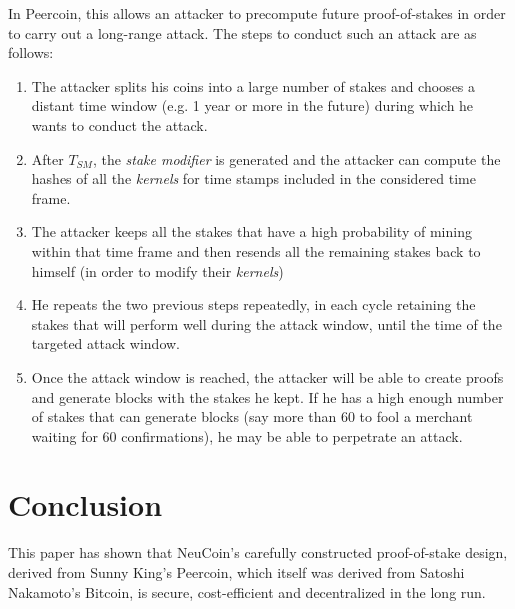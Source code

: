 \documentclass[a4paper,11pt]{article}
\begin{document}
In Peercoin, this allows an attacker to precompute future proof-of-stakes in order to carry out a long-range attack. The steps to conduct such an attack are as follows:
\begin{enumerate}
\setlength{\itemsep}{0pt}
\item{The attacker splits his coins into a large number of stakes and chooses a distant time window (e.g. 1 year or more in the future) during which he wants to conduct the attack.}
\item{After $T_{SM}$, the \textit{stake modifier} is generated and the attacker can compute the hashes of all the \textit{kernels} for time stamps included in the considered time frame.}
\item{The attacker keeps all the stakes that have a high probability of mining within that time frame and then resends all the remaining stakes back to himself (in order to modify their \textit{kernels})}
\item{He repeats the two previous steps repeatedly, in each cycle retaining the stakes that will perform well during the attack window, until the time of the targeted attack window.}
\item{Once the attack window is reached, the attacker will be able to create proofs and generate blocks with the stakes he kept. If he has a high enough number of stakes that can generate blocks (say more than 60 to fool a merchant waiting for 60 confirmations), he may be able to perpetrate an attack.}
\end{enumerate}

\newpage

\section{Conclusion}
This paper has shown that NeuCoin's carefully constructed proof-of-stake design, derived from Sunny King's Peercoin, which itself was derived from Satoshi Nakamoto's Bitcoin, is secure, cost-efficient and decentralized in the long run.
 
\end{document}
